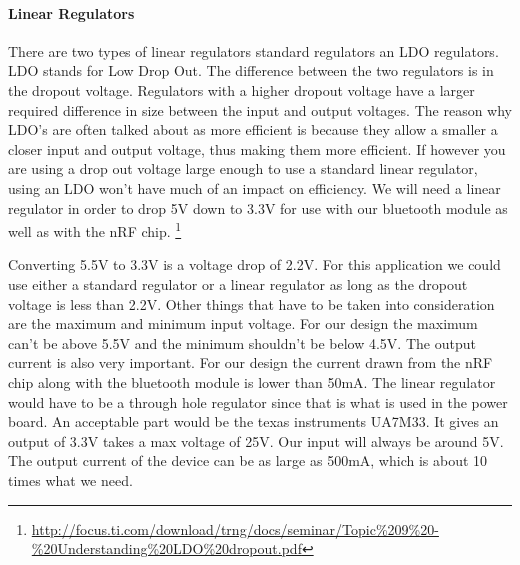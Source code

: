 \paragraph{Linear Regulators}
There are two types of linear regulators standard regulators an LDO regulators.
LDO stands for Low Drop Out. The difference between the two regulators is in
the dropout voltage. Regulators with a higher dropout voltage have a larger
required difference in size between the input and output voltages. The reason
why LDO{}'s are often talked about as more efficient is because they allow a
smaller a closer input and output voltage, thus making them more efficient. If
however you are using a drop out voltage large enough to use a standard linear
regulator, using an LDO won{}'t have much of an impact on efficiency. We will
need a linear regulator in order to drop 5V down to 3.3V for use with our
bluetooth module as well as with the nRF chip.
\footnote{\url{http://focus.ti.com/download/trng/docs/seminar/Topic\%209\%20-\%20Understanding\%20LDO\%20dropout.pdf}}

Converting 5.5V to 3.3V is a voltage drop of 2.2V. For this application we
could use either a standard regulator or a linear regulator as long as the
dropout voltage is less than 2.2V. Other things that have to be taken into
consideration are the maximum and minimum input voltage. For our design the
maximum can{}'t be above 5.5V and the minimum shouldn{}'t be below 4.5V. The
output current is also very important. For our design the current drawn from
the nRF chip along with the bluetooth module is lower than 50mA. The linear
regulator would have to be a through hole regulator since that is what is used
in the power board. An acceptable part would be the texas instruments UA7M33.
It gives an output of 3.3V takes a max voltage of 25V. Our input will always be
around 5V. The output current of the device can be as large as 500mA, which is
about 10 times what we need.

